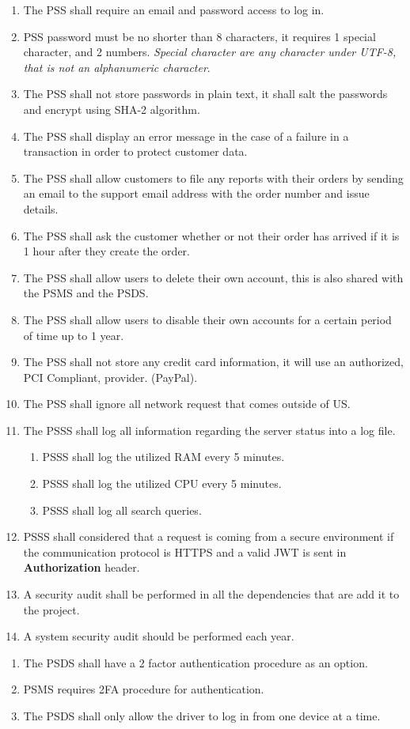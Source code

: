 \begin{enumerate}[label=SEC-\arabic*]
    \item The PSS shall require an email and password access to log in.
    \item PSS password must be no shorter than 8 characters, it requires
    1 special character, and 2 numbers. \textit{Special character are 
    any character under UTF-8, that is not an alphanumeric character}.
    \item The PSS shall not store passwords in plain text, it shall salt the 
    passwords and encrypt using SHA-2 algorithm.
    \item The PSS shall display an error message in the case of a failure in a 
    transaction in order to protect customer data.
    \item The PSS shall allow customers to file any reports with their orders 
    by sending an email to the support email address with the order number and 
    issue details.
    \item The PSS shall ask the customer whether or not their order has arrived 
    if it is 1 hour after they create the order.
    \item The PSS shall allow users to delete their own account, this is also 
    shared with the PSMS and the PSDS.
    \item The PSS shall allow users to disable their own accounts for a certain 
    period of time up to 1 year.
    \item The PSS shall not store any credit card information, it will use an 
    authorized, PCI Compliant, provider. (PayPal).
    \item The PSS shall ignore all network request that comes outside of US.
    \item The PSSS shall log all information regarding the server status 
    into a log file.
    \begin{enumerate}[label=SEC-11.\arabic*]
        \item PSSS shall log the utilized RAM every 5 minutes. 
        \item PSSS shall log the utilized CPU every 5 minutes.
        \item PSSS shall log all search queries.
    \end{enumerate}
    \item PSSS shall considered that a request is coming from a secure 
    environment if the communication protocol is HTTPS and a 
    valid JWT \cite{jwt} is sent in \textbf{Authorization} header.
    \item A security audit shall be performed in all the dependencies that 
    are add it to the project.
    \item A system security audit should be performed each year.
\end{enumerate}
\pagebreak
\begin{enumerate}[resume, label=SEC-\arabic*]
    \item The PSDS shall have a 2 factor authentication procedure as an option.
    \item PSMS requires 2FA procedure for authentication.
    \item The PSDS shall only allow the driver to log in from one 
    device at a time.
\end{enumerate}
